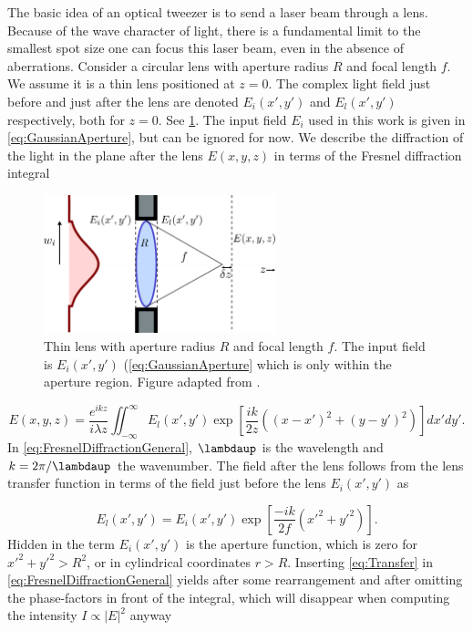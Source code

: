 The basic idea of an optical tweezer is to send a laser beam through a lens.
Because of the wave character of light, there is a fundamental limit to the smallest spot size one can focus this laser beam, even in the absence of aberrations.
Consider a circular lens with aperture radius $R$ and focal length $f$.
We assume it is a thin lens positioned at $z=0$.
The complex light field just before and just after the lens are denoted $E_i(x',y')$ and $E_l(x',y')$ respectively, both for $z=0$.
See \cref{fig:LensAperture}.
The input field $E_i$ used in this work is given in \cref{eq:GaussianAperture}, but can be ignored for now.
We describe the diffraction of the light in the plane after the lens $E(x,y,z)$ in terms of the Fresnel diffraction integral \cite{Goodman2005}

\begin{figure}
	\centering
	\includegraphics[width=0.6\textwidth]{figures/lens.pdf}
	\caption{Thin lens with aperture radius $R$ and focal length $f$. 
	The input field is $E_i(x',y')$ (\cref{eq:GaussianAperture} which is only within the aperture region. Figure adapted from \cite{Leseleuc2018,Gu2000}.}
	\label{fig:LensAperture}
\end{figure}

\begin{equation}\label{eq:FresnelDiffractionGeneral}
    E(x,y,z) = 
    \frac{e^{ikz}}{i \lambda z} \iint_{-\infty}^{\infty} E_l(x',y') \exp{\left[\frac{ik}{2z}\left((x-x')^2+(y-y')^2\right)\right]} dx'dy'.
\end{equation}
In \cref{eq:FresnelDiffractionGeneral}, $\lambdaup$ is the wavelength and $k=2\pi/\lambdaup$ the wavenumber.
The field after the lens follows from the lens transfer function in terms of the field just before the lens $E_i(x',y')$ as \cite{Goodman2005}

\begin{equation}\label{eq:Transfer}
	E_l(x',y')= E_i(x',y') \exp{
		\left[\frac{-i k}{2 f}(x'^2+y'^2)\right].
	}
\end{equation}
Hidden in the term $E_i(x',y')$ is the aperture function, which is zero for $x'^2+y'^2>R^2$, or in cylindrical coordinates $r>R$.
Inserting \cref{eq:Transfer} in \cref{eq:FresnelDiffractionGeneral} yields after some rearrangement and after omitting the phase-factors in front of the integral, which will disappear when computing the intensity $I \propto |E|^2$ anyway \cite{Gu2000}

